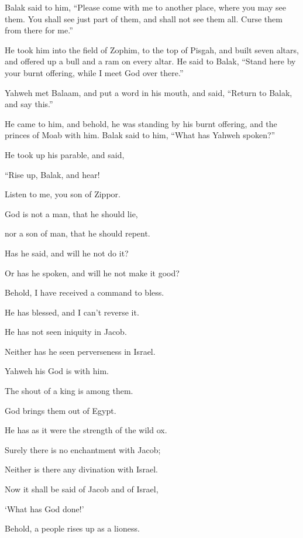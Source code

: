 {\par }{\PP {}Balak said to him, “Please come with me to another place, where you may see them. You shall see just part of them, and shall not see them all. Curse them from there for me.”
\par }{\PP {}He took him into the field of Zophim, to the top of Pisgah, and built seven altars, and offered up a bull and a ram on every altar.
He said to Balak, “Stand here by your burnt offering, while I meet God over there.”
\par }{\PP {}Yahweh met Balaam, and put a word in his mouth, and said, “Return to Balak, and say this.”
\par }{\PP {}He came to him, and behold, he was standing by his burnt offering, and the princes of Moab with him. Balak said to him, “What has Yahweh spoken?”
\par }{\PP {}He took up his parable, and said,
\par }{\Q “Rise up, Balak, and hear!
\par }{\QB Listen to me, you son of Zippor.
\par }{\Q {}God is not a man, that he should lie,
\par }{\QB nor a son of man, that he should repent.
\par }{\Q Has he said, and will he not do it?
\par }{\QB Or has he spoken, and will he not make it good?
\par }{\Q {}Behold, I have received a command to bless.
\par }{\QB He has blessed, and I can’t reverse it.
\par }{\Q {}He has not seen iniquity in Jacob.
\par }{\QB Neither has he seen perverseness in Israel.
\par }{\Q Yahweh his God is with him.
\par }{\QB The shout of a king is among them.
\par }{\Q {}God brings them out of Egypt.
\par }{\QB He has as it were the strength of the wild ox.
\par }{\Q {}Surely there is no enchantment with Jacob;
\par }{\QB Neither is there any divination with Israel.
\par }{\Q Now it shall be said of Jacob and of Israel,
\par }{\QB ‘What has God done!’
\par }{\Q {}Behold, a people rises up as a lioness.
}

